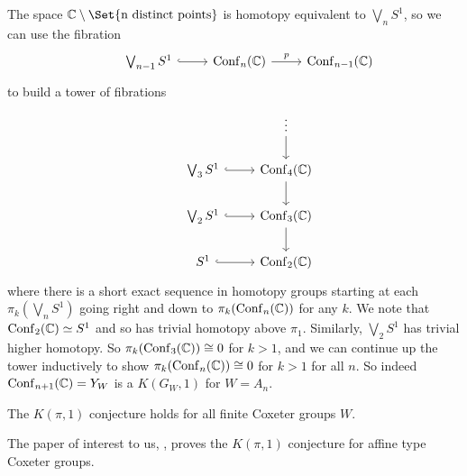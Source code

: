 \documentclass[class=article, crop=false]{standalone}
\begin{document}
The space $\C \setminus \Set{\text{n distinct points}}$ is homotopy equivalent to $\bigvee_n S^1$, so we can use the fibration
\begin{equation*}
	\begin{tikzcd}
		&\bigvee_{n-1} S^1 \arrow[hook]{r} &\conf_n(\C) \arrow{r}{p} &\conf_{n-1}(\C)
	\end{tikzcd}
\end{equation*}
to build a tower of fibrations
\begin{equation*}
	\begin{tikzcd}
		& 							&\vdots \arrow{d} 	\\
		&\bigvee_3 S^1 	\arrow[hook]{r} 	&\conf_4(\C)  \arrow{d} \\
		&\bigvee_2 S^1 	\arrow[hook]{r} 	&\conf_3(\C)  \arrow{d} \\
		&S^1 	\arrow[hook]{r} 	&\conf_2(\C)
	\end{tikzcd}
\end{equation*}
where there is a short exact sequence in homotopy groups starting at each $\pi_k(\bigvee_n S^1)$ going right and down to $\pi_k(\operatorname{Conf}_n(\mathbb{C}))$ for any $k$. We note that $\operatorname{Conf}_2(\mathbb{C}) \simeq S^1$ and so has trivial homotopy above $\pi_1$. Similarly, $\bigvee_2 S^1$ has trivial higher homotopy. So $\pi_k(\operatorname{Conf}_3(\mathbb{C})) \cong 0$ for $k>1$, and we can continue up the tower inductively to show $\pi_k(\operatorname{Conf}_n(\mathbb{C})) \cong 0$ for $k>1$ for all $n$. So indeed $\operatorname{Conf}_{n+1}(\mathbb{C}) = Y_W$ is a $K(G_W,1)$ for $W=A_n$.

\begin{theorem}
	The $K(\pi,1)$ conjecture holds for all finite Coxeter groups $W$.
	\label{thm:k_pi_1_finite}
\end{theorem}

The paper of interest to us, \cite{paolini_salvetti_kpi1_2021}, proves the $K(\pi,1)$ conjecture for affine type Coxeter groups. 
\end{document}
